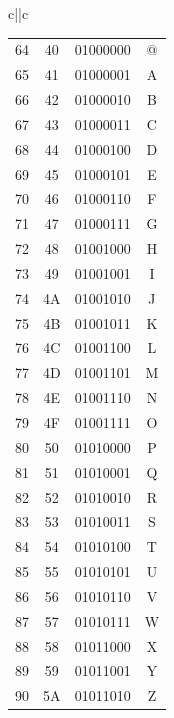 \begin{table}[H]
{\begin{tabular}{c||c}
\begin{tabular}{cccc}
				64      & 40          & 01000000 & @               \\
				65      & 41          & 01000001 & A               \\
				66      & 42          & 01000010 & B               \\
				67      & 43          & 01000011 & C               \\
				68      & 44          & 01000100 & D               \\
				69      & 45          & 01000101 & E               \\
				70      & 46          & 01000110 & F               \\
				71      & 47          & 01000111 & G               \\
				72      & 48          & 01001000 & H               \\
				73      & 49          & 01001001 & I               \\
				74      & 4A          & 01001010 & J               \\
				75      & 4B          & 01001011 & K               \\
				76      & 4C          & 01001100 & L               \\
				77      & 4D          & 01001101 & M               \\
				78      & 4E          & 01001110 & N               \\
				79      & 4F          & 01001111 & O               \\
				80      & 50          & 01010000 & P               \\
				81      & 51          & 01010001 & Q               \\
				82      & 52          & 01010010 & R               \\
				83      & 53          & 01010011 & S               \\
				84      & 54          & 01010100 & T               \\
				85      & 55          & 01010101 & U               \\
				86      & 56          & 01010110 & V               \\
				87      & 57          & 01010111 & W               \\
				88      & 58          & 01011000 & X               \\
				89      & 59          & 01011001 & Y               \\
				90      & 5A          & 01011010 & Z               \\

\end{tabular}
\end{tabular}}
\end{table}
